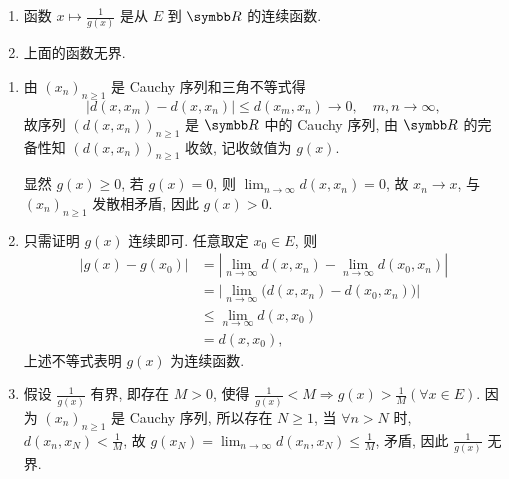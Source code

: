 \begin{enumerate}
\begin{enumerate}
        \item 函数 $x\mapsto\frac{1}{g(x)}$ 是从 $E$ 到 $\R$ 的连续函数.
        \item 上面的函数无界.
    \end{enumerate}
    \begin{answer}
      \begin{enumerate}
        \item 由 $(x_n)_{n\geq 1}$ 是 Cauchy 序列和三角不等式得
        \[|d(x,x_m)-d(x,x_n)|\leq d(x_m,x_n)\to 0,\quad m,n\to\infty,\]
        故序列 $(d(x,x_n))_{n\geq 1}$ 是 $\R$ 中的 Cauchy 序列, 
        由 $\R$ 的完备性知 $(d(x,x_n))_{n\geq 1}$ 收敛, 记收敛值为 $g(x)$.
    
        显然 $g(x)\geq 0$, 若 $g(x)=0$, 则 $\lim_{n\to\infty}d(x,x_n)=0$, 
        故 $x_n\to x$, 与 $(x_n)_{n\geq 1}$ 发散相矛盾, 因此 $g(x)>0$.
    
        \item 只需证明 $g(x)$ 连续即可. 任意取定 $x_0\in E$, 则
        \begin{align*}
            |g(x)-g(x_0)| & =|\lim_{n\to\infty}d(x,x_n)-\lim_{n\to\infty}d(x_0,x_n)| \\
                        & =\bigl|\lim_{n\to\infty}\bigl(d(x,x_n)-d(x_0,x_n)\bigr)\bigr| \\
                        & \leq\lim_{n\to\infty}d(x,x_0) \\
                        & =d(x,x_0),
        \end{align*}
        上述不等式表明 $g(x)$ 为连续函数.
    
        \item 假设 $\frac{1}{g(x)}$ 有界, 即存在 $M>0$,
        使得 $\frac{1}{g(x)}<M\Rightarrow g(x)>\frac{1}{M}(\forall x\in E)$.
        因为 $(x_n)_{n\geq 1}$ 是 Cauchy 序列, 
        所以存在 $N\geq 1$, 当 $\forall n>N$ 时, $d(x_n,x_N)<\frac{1}{M}$,
        故 $g(x_N)=\lim_{n\to\infty}d(x_n,x_N)\leq\frac{1}{M}$, 矛盾, 因此 $\frac{1}{g(x)}$ 无界.
      \end{enumerate}
    \end{answer}


\end{enumerate}

